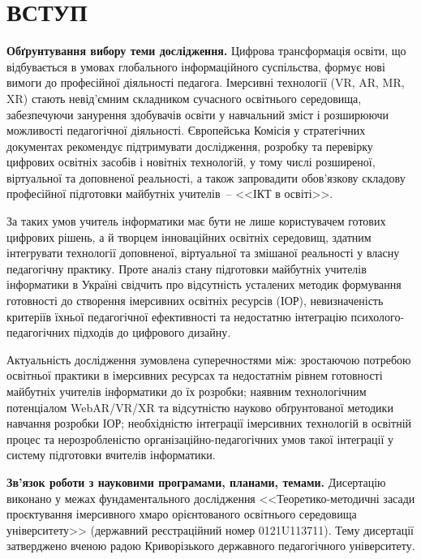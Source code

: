 \section*{\centering ВСТУП}
\label{first_page}

\textbf{Обґрунтування вибору теми дослідження.} Цифрова трансформація освіти, що відбувається в умовах глобального інформаційного суспільства, формує нові вимоги до професійної діяльності педагога. Імерсивні технології (VR, AR, MR, XR) стають невід'ємним складником сучасного освітнього середовища, забезпечуючи занурення здобувачів освіти у навчальний зміст і розширюючи можливості педагогічної діяльності. Європейська Комісія у стратегічних документах рекомендує підтримувати дослідження, розробку та перевірку цифрових освітніх засобів і новітніх технологій, у тому числі розширеної, віртуальної та доповненої реальності, а також запровадити обов'язкову складову професійної підготовки майбутніх учителів~-- <<ІКТ в освіті>>.

За таких умов учитель інформатики має бути не лише користувачем готових цифрових рішень, а й творцем інноваційних освітніх середовищ, здатним інтегрувати технології доповненої, віртуальної та змішаної реальності у власну педагогічну практику. Проте аналіз стану підготовки майбутніх учителів інформатики в Україні свідчить про відсутність усталених методик формування готовності до створення імерсивних освітніх ресурсів (ІОР), невизначеність критеріїв їхньої педагогічної ефективності та недостатню інтеграцію психолого-педагогічних підходів до цифрового дизайну.

Актуальність дослідження зумовлена суперечностями між: зростаючою потребою освітньої практики в імерсивних ресурсах та недостатнім рівнем готовності майбутніх учителів інформатики до їх розробки; наявним технологічним потенціалом WebAR/VR/XR та відсутністю науково обґрунтованої методики навчання розробки ІОР; необхідністю інтеграції імерсивних технологій в освітній процес та нерозробленістю організаційно-педагогічних умов такої інтеграції у систему підготовки вчителів інформатики.

\textbf{Зв'язок роботи з науковими програмами, планами, темами.} Дисертацію виконано у межах фундаментального дослідження <<Теоретико-методичні засади проєктування імерсивного хмаро орієнтованого освітнього середовища університету>> (державний реєстраційний номер 0121U113711). Тему дисертації затверджено вченою радою Криворізького державного педагогічного університету.

